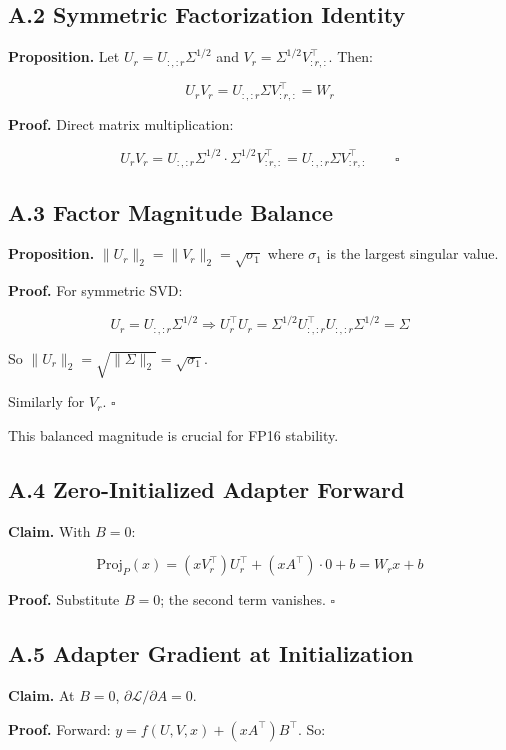 \subsection{A.2 Symmetric Factorization Identity}

\textbf{Proposition.} Let $U_r = U_{:, :r} \Sigma^{1/2}$ and $V_r = \Sigma^{1/2} V_{:r, :}^\top$. 
Then:

\[
U_r V_r = U_{:, :r} \Sigma V_{:r, :}^\top = W_r
\tag{A.3}
\]

\textbf{Proof.} Direct matrix multiplication:

\[
U_r V_r = U_{:, :r} \Sigma^{1/2} \cdot \Sigma^{1/2} V_{:r, :}^\top = U_{:, :r} \Sigma V_{:r, :}^\top \qquad \square
\]

\subsection{A.3 Factor Magnitude Balance}

\textbf{Proposition.} $\|U_r\|_2 = \|V_r\|_2 = \sqrt{\sigma_1}$ where $\sigma_1$ is 
the largest singular value.

\textbf{Proof.} For symmetric SVD:

\[
U_r = U_{:, :r} \Sigma^{1/2} \Rightarrow U_r^\top U_r = \Sigma^{1/2} U_{:, :r}^\top U_{:, :r} \Sigma^{1/2} = \Sigma
\tag{A.4}
\]

So $\|U_r\|_2 = \sqrt{\|\Sigma\|_2} = \sqrt{\sigma_1}$.

Similarly for $V_r$. $\square$

This balanced magnitude is crucial for FP16 stability.

\subsection{A.4 Zero-Initialized Adapter Forward}

\textbf{Claim.} With $B = 0$:

\[
\text{Proj}_P(x) = (x V_r^\top) U_r^\top + (x A^\top) \cdot 0 + b = W_r x + b
\tag{A.5}
\]

\textbf{Proof.} Substitute $B = 0$; the second term vanishes. $\square$

\subsection{A.5 Adapter Gradient at Initialization}

\textbf{Claim.} At $B = 0$, $\partial \mathcal{L} / \partial A = 0$.

\textbf{Proof.} Forward: $y = f(U, V, x) + (x A^\top) B^\top$. So:

